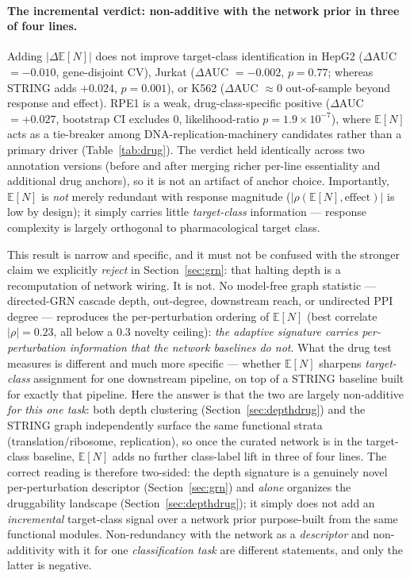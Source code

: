 \documentclass[11pt]{article}
\newcommand{\EN}{\ensuremath{\mathbb{E}[N]}}
\let\mathrho\rho
\renewcommand{\rho}{\ensuremath{\mathrho}}
\begin{document}
\paragraph{The incremental verdict: non-additive with the network prior in three of four lines.} Adding $|\Delta\EN{}|$ does not
improve target-class identification in HepG2 ($\Delta$AUC $=-0.010$, gene-disjoint CV), Jurkat
($\Delta$AUC $=-0.002$, $p=0.77$; whereas STRING adds $+0.024$, $p=0.001$), or K562
($\Delta$AUC $\approx0$ out-of-sample beyond response and effect). RPE1 is a weak, drug-class-specific
positive ($\Delta$AUC $=+0.027$, bootstrap CI excludes 0, likelihood-ratio $p=1.9\times10^{-7}$),
where \EN{} acts as a tie-breaker among DNA-replication-machinery candidates rather than a primary
driver (Table~\ref{tab:drug}). The verdict held identically across two annotation versions
(before and after merging richer per-line essentiality and additional drug anchors), so it is not
an artifact of anchor choice. Importantly, \EN{} is \emph{not} merely redundant with response
magnitude ($|\rho(\EN{},\text{effect})|$ is low by design); it simply carries little
\emph{target-class} information --- response complexity is largely orthogonal to pharmacological
target class.

This result is narrow and specific, and it must not be confused with the stronger claim we
explicitly \emph{reject} in Section~\ref{sec:grn}: that halting depth is a recomputation of network
wiring. It is not. No model-free graph statistic --- directed-GRN cascade depth, out-degree,
downstream reach, or undirected PPI degree --- reproduces the per-perturbation ordering of \EN{}
(best correlate $|\rho|=0.23$, all below a $0.3$ novelty ceiling): \emph{the adaptive signature
carries per-perturbation information that the network baselines do not}. What the drug test measures
is different and much more specific --- whether \EN{} sharpens \emph{target-class} assignment for one
downstream pipeline, on top of a STRING baseline built for exactly that pipeline. Here the answer is
that the two are largely non-additive \emph{for this one task}: both depth clustering
(Section~\ref{sec:depthdrug}) and the STRING graph independently surface the same functional strata
(translation/ribosome, replication), so once the curated network is in the target-class baseline,
\EN{} adds no further class-label lift in three of four lines. The correct reading is therefore
two-sided: the depth signature is a genuinely novel per-perturbation descriptor
(Section~\ref{sec:grn}) and \emph{alone} organizes the druggability landscape
(Section~\ref{sec:depthdrug}); it simply does not add an \emph{incremental} target-class signal over a
network prior purpose-built from the same functional modules. Non-redundancy with the network as a
\emph{descriptor} and non-additivity with it for one \emph{classification task} are different
statements, and only the latter is negative.
\end{document}
